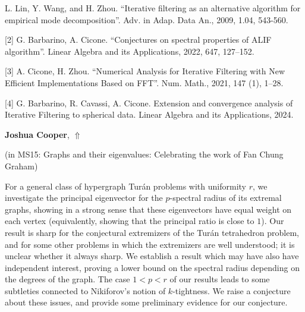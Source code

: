 \documentclass[ILAS2025-program.tex]{subfiles}
\begin{document}
\begin{ilasabstract}
[1] L. Lin, Y. Wang, and H. Zhou. ``Iterative filtering as an alternative algorithm for empirical mode decomposition''. Adv. in Adap. Data An., 2009, 1.04, 543-560.

[2] G. Barbarino, A. Cicone. ``Conjectures on spectral properties of ALIF algorithm''. Linear Algebra and its Applications, 2022, 647, 127--152.

[3] A. Cicone, H. Zhou. ``Numerical Analysis for Iterative Filtering with New Efficient Implementations Based on FFT''. Num. Math., 2021, 147 (1), 1--28.

[4] G. Barbarino, R. Cavassi, A. Cicone. Extension and convergence analysis of Iterative Filtering to spherical data. Linear Algebra and its Applications, 2024.

\end{ilasabstract}
     \hypertarget{down0029}{}\begin{ilasabstract}
    
    \textbf{Joshua Cooper},  \hfill \hyperlink{up0029}{$\Uparrow$}
    
    (in {\color{mstitle}MS15: Graphs and their eigenvalues: Celebrating the work of Fan Chung Graham})
        
        \mtskip
    For a general class of hypergraph Tur\'{a}n problems with uniformity $r$, we investigate the principal eigenvector for the $p$-spectral radius of its extremal graphs, showing in a strong sense that these eigenvectors have equal weight on each vertex (equivalently, showing that the principal ratio is close to $1$). Our result is sharp for the conjectural extremizers of the Tur\'{a}n tetrahedron problem, and for some other problems in which the extremizers are well understood; it is unclear whether it always sharp. We establish a result which may have also have independent interest, proving a lower bound on the spectral radius depending on the degrees of the graph. The case $1 < p < r$ of our results leads to some subtleties connected to Nikiforov's notion of $k$-tightness. We raise a conjecture about these issues, and provide some preliminary evidence for our conjecture.
\end{ilasabstract}
\end{document}

